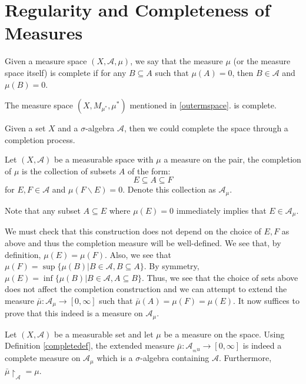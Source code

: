 \documentclass[main.tex]{subfiles}
\begin{document}
\section{Regularity and Completeness of Measures}

\begin{definition}
Given a measure space $(X,\mathcal{A},\mu)$, we say that the measure $\mu$ (or the measure space itself) is complete if for any $B \subseteq A$ such that $\mu(A) = 0$, then $B \in \mathcal{A}$ and $\mu(B) = 0$.
\end{definition}

\begin{example}
The measure space $(X,M_{\mu^*},\mu^*)$ mentioned in \ref{outermspace}. is complete.
\end{example}

Given a set $X$ and a $\sigma$-algebra $\mathcal{A}$, then we could complete the space through a completion process.

\begin{definition}
\label{completedef}
 Let $(X,\mathcal{A})$ be a measurable space with $\mu$ a measure on the pair, the completion of $\mu$ is the collection of subsets $A$ of the form:
 $$ E \subseteq A \subseteq F $$ for $E,F \in \mathcal{A}$ and $\mu(F\backslash E) = 0$. Denote this collection as $\mathcal{A}_{\mu}$.
\end{definition}

\begin{remark}
 Note that any subset $A \subseteq E$ where $\mu(E) = 0$ immediately implies that $E \in \mathcal{A}_{\mu}$.
\end{remark}

We must check that this construction does not depend on the choice of $E,F$ as above and thus the completion measure will be well-defined. We see that, by definition, $\mu(E) = \mu(F)$. Also, we see that $\mu(F) = \sup \{ \mu(B) \vert B \in \mathcal{A}, B \subseteq A \}$. By symmetry, $\mu(E) = \inf\{\mu(B) \vert B \in \mathcal{A}, A \subseteq B\}$. Thus, we see that the choice of sets above does not affect the completion construction and we can attempt to extend the measure $\bar{\mu}: \mathcal{A}_{\mu} \rightarrow [0,\infty]$ such that $\bar{\mu}(A) = \mu(F) = \mu(E)$. It now suffices to prove that this indeed is a measure on $\mathcal{A}_{\mu}$.

\begin{theorem}
 Let $(X,\mathcal{A})$ be a measurable set and let $\mu$ be a measure on the space. Using Definition \ref{completedef}, the extended measure $\bar{\mu}:\mathcal{A}_{_mu} \rightarrow [0,\infty]$ is indeed a complete measure on $\mathcal{A}_{\mu}$ which is a $\sigma$-algebra containing $\mathcal{A}$. Furthermore, $\bar{\mu} \restriction_{\mathcal{A}} = \mu$.
\end{theorem}
\end{document}
